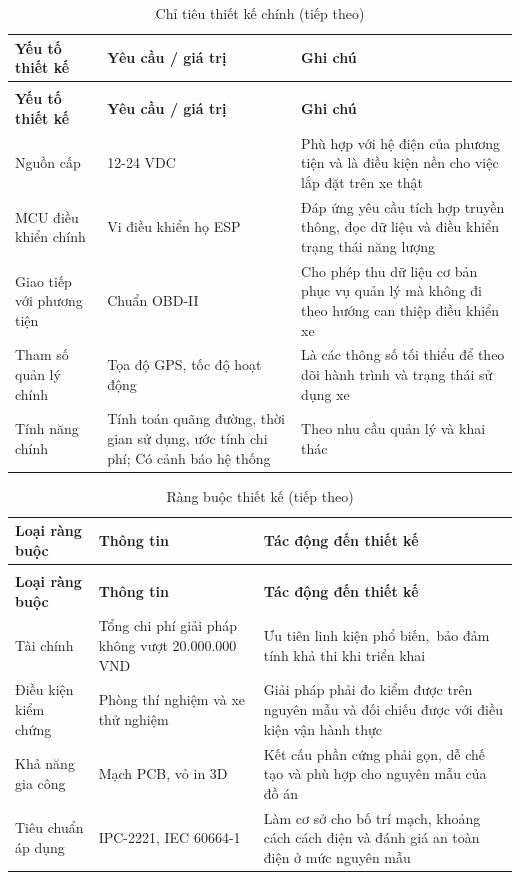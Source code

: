 \documentclass[a4paper]{extarticle}
\newcommand{\thesissettableid}[2]{%
  \renewcommand{\thetable}{#1}%
  \renewcommand{\theHtable}{#2}%
}
\begin{document}
{\thesissettableid{2.4}{condensed-r2-bang-2-4-chi-tieu-thiet-ke-chinh}
\def\LTcaptype{table}
\begin{longtable}{|L{(\linewidth - 4\tabcolsep) * }|L{(\linewidth - 4\tabcolsep) * }|L{(\linewidth - 4\tabcolsep) * }|}
\caption{Chỉ tiêu thiết kế chính}\label{tab:condensed-r2-bang-2-4-chi-tieu-thiet-ke-chinh}\\
\hline
\textbf{Yếu tố thiết kế} & \textbf{Yêu cầu / giá trị} & \textbf{Ghi chú} \\
\hline
\endfirsthead
\caption[]{Chỉ tiêu thiết kế chính (tiếp theo)}\\
\hline
\textbf{Yếu tố thiết kế} & \textbf{Yêu cầu / giá trị} & \textbf{Ghi chú} \\
\hline
\endhead
\endfoot
\endlastfoot
Nguồn cấp & 12-24 VDC & Phù hợp với hệ điện của phương tiện và là điều kiện nền cho việc lắp đặt trên xe thật \\\hline
MCU điều khiển chính & Vi điều khiển họ ESP & Đáp ứng yêu cầu tích hợp truyền thông, đọc dữ liệu và điều khiển trạng thái năng lượng \\\hline
Giao tiếp với phương tiện & Chuẩn OBD-II & Cho phép thu dữ liệu cơ bản phục vụ quản lý mà không đi theo hướng can thiệp điều khiển xe \\\hline
Tham số quản lý chính & Tọa độ GPS, tốc độ hoạt động & Là các thông số tối thiểu để theo dõi hành trình và trạng thái sử dụng xe \\\hline
Tính năng chính & Tính toán quãng đường, thời gian sử dụng, ước tính chi phí; Có cảnh báo hệ thống & Theo nhu cầu quản lý và khai thác \\\hline
\end{longtable}
}
{\thesissettableid{2.5}{condensed-r2-bang-2-5-rang-buoc-thiet-ke}
\def\LTcaptype{table}
\begin{longtable}{|L{(\linewidth - 4\tabcolsep) * }|L{(\linewidth - 4\tabcolsep) * }|L{(\linewidth - 4\tabcolsep) * }|}
\caption{Ràng buộc thiết kế}\label{tab:condensed-r2-bang-2-5-rang-buoc-thiet-ke}\\
\hline
\textbf{Loại ràng buộc} & \textbf{Thông tin} & \textbf{Tác động đến thiết kế} \\
\hline
\endfirsthead
\caption[]{Ràng buộc thiết kế (tiếp theo)}\\
\hline
\textbf{Loại ràng buộc} & \textbf{Thông tin} & \textbf{Tác động đến thiết kế} \\
\hline
\endhead
\endfoot
\endlastfoot
Tài chính & Tổng chi phí giải pháp không vượt 20.000.000 VND & Ưu tiên linh kiện phổ biến,~bảo đảm tính khả thi khi triển khai \\\hline
Điều kiện kiểm chứng & Phòng thí nghiệm và xe thử nghiệm & Giải pháp phải đo kiểm được trên nguyên mẫu và đối chiếu được với điều kiện vận hành thực \\\hline
Khả năng gia công & Mạch PCB, vỏ in 3D & Kết cấu phần cứng phải gọn, dễ chế tạo và phù hợp cho nguyên mẫu của đồ án \\\hline
Tiêu chuẩn áp dụng & IPC-2221, IEC 60664-1 & Làm cơ sở cho bố trí mạch, khoảng cách cách điện và đánh giá an toàn điện ở mức nguyên mẫu \\\hline
\end{longtable}
}
\end{document}
